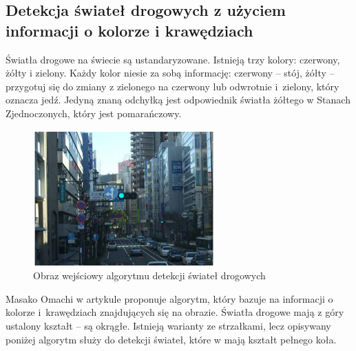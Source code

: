 \subsection{Detekcja świateł drogowych z użyciem informacji o kolorze i krawędziach}

Światła drogowe na świecie są ustandaryzowane. %
Istnieją trzy kolory: czerwony, żółty i zielony. 
Każdy kolor niesie za sobą informację: czerwony -- stój, żółty -- przygotuj się do zmiany z zielonego na czerwony lub odwrotnie i~zielony, który oznacza jedź. 
Jedyną znaną odchyłką jest odpowiednik światła żółtego w Stanach Zjednoczonych, który jest pomarańczowy. %

\begin{figure}
  \centering
  \includegraphics[width=7cm]{img/tl_input.png}
  \caption{Obraz wejściowy algorytmu detekcji świateł drogowych\cite{T4}}
  \label{fig:tl_input}
\end{figure}

Masako Omachi w artykule \cite{T4} proponuje algorytm, który bazuje na informacji o kolorze i~krawędziach znajdujących się na obrazie. 
Światła drogowe mają z góry ustalony kształt -- są okrągłe. 
Istnieją warianty ze strzałkami, lecz opisywany poniżej algorytm służy do detekcji świateł, które w \cite{Kodeks} mają kształt pełnego koła.


